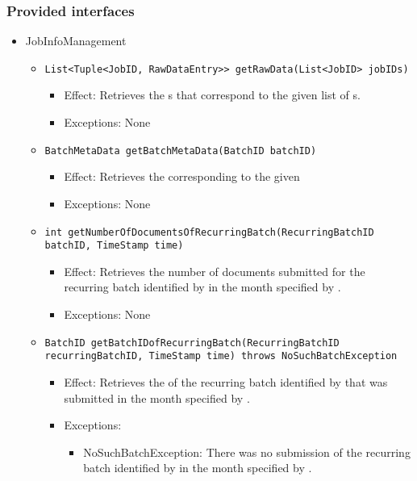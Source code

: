\subsubsection*{Provided interfaces}
\begin{itemize}
    \item JobInfoManagement
    \begin{itemize}
        \item \texttt{List<Tuple<JobID, RawDataEntry>> getRawData(List<JobID> jobIDs)}
        \begin{itemize}
            \item Effect: Retrieves the s that correspond to the given list of s.
            \item Exceptions: None
        \end{itemize}

        \item \texttt{BatchMetaData getBatchMetaData(BatchID batchID)}
		\begin{itemize}
            \item Effect: Retrieves the  corresponding to the given 
            \item Exceptions: None
        \end{itemize}

		\item \texttt{int getNumberOfDocumentsOfRecurringBatch(RecurringBatchID batchID, TimeStamp time)}
		\begin{itemize}
            \item Effect: Retrieves the number of documents submitted for the recurring batch identified by  in the month specified by .
            \item Exceptions: None
        \end{itemize}

		\item \texttt{BatchID getBatchIDofRecurringBatch(RecurringBatchID recurringBatchID, TimeStamp time) throws NoSuchBatchException}
		\begin{itemize}
            \item Effect: Retrieves the  of the recurring batch identified by  that was submitted in the month specified by .
            \item Exceptions:
			\begin{itemize}
				\item NoSuchBatchException: There was no submission of the recurring batch identified by  in the month specified by .
			\end{itemize}
        \end{itemize}


\end{itemize}
\end{itemize}
